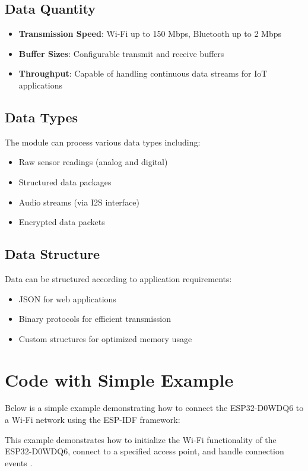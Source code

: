 \subsection{Data Quantity}
\begin{itemize}
	\item \textbf{Transmission Speed}: Wi-Fi up to 150 Mbps, Bluetooth up to 2 Mbps
	\item \textbf{Buffer Sizes}: Configurable transmit and receive buffers
	\item \textbf{Throughput}: Capable of handling continuous data streams for IoT applications \cite{Doyu:2021}
\end{itemize}

\subsection{Data Types}
The module can process various data types including:
\begin{itemize}
	\item Raw sensor readings (analog and digital)
	\item Structured data packages
	\item Audio streams (via I2S interface)
	\item Encrypted data packets
\end{itemize}

\subsection{Data Structure}
Data can be structured according to application requirements:
\begin{itemize}
	\item JSON for web applications
	\item Binary protocols for efficient transmission
	\item Custom structures for optimized memory usage \cite{Babiuch:2019}
\end{itemize}

\section{Code with Simple Example}

Below is a simple example demonstrating how to connect the ESP32-D0WDQ6 to a Wi-Fi network using the ESP-IDF framework:


{
	\label{ESP32D0WDQ6WiFiModule:example}
}


This example demonstrates how to initialize the Wi-Fi functionality of the ESP32-D0WDQ6, connect to a specified access point, and handle connection events \cite{Babiuch:2019}.



